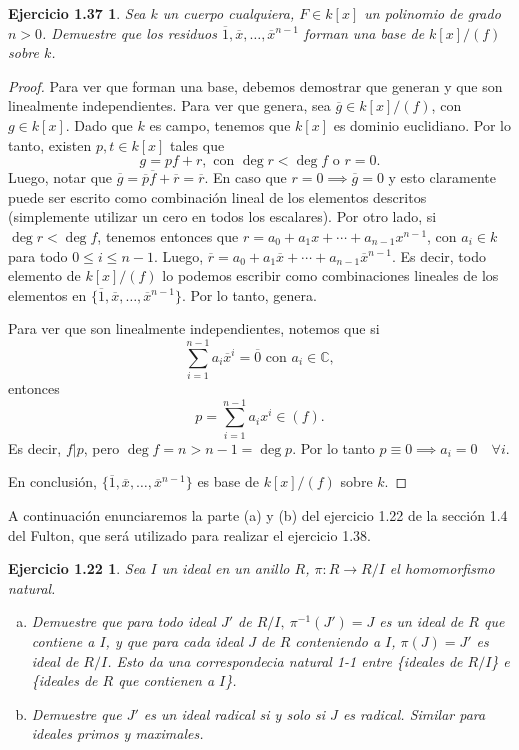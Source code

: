 \documentclass{amsart}
\theoremstyle{plain}
\newtheorem*{ejercicio4}{Ejercicio 1.37}
\newtheorem*{ejercicio22}{Ejercicio 1.22}
\newcommand{\C}{\mathbb{C}}
\begin{document}
	\begin{ejercicio4}
		Sea $k$ un cuerpo cualquiera, $F \in k[x]$ un polinomio de grado $n > 0$. Demuestre que los residuos $\overline{1},\overline{x},\dots,\overline{x}^{n - 1}$ forman una base de $k[x] \slash (f)$ sobre $k$.
	\end{ejercicio4}
	\begin{proof}
		Para ver que forman una base, debemos demostrar que generan y que son linealmente independientes. Para ver que genera, sea $\overline{g} \in k[x] \slash (f)$, con $g \in k[x]$. Dado que $k$ es campo, tenemos que $k[x]$ es dominio euclidiano. Por lo tanto, existen $p,t \in k[x]$ tales que
		\[ g = pf + r, \text{ con } \deg r < \deg f \text{ o } r = 0. \]
		Luego, notar que $\overline{g} = \overline{p} \overline{f} + \overline{r} = \overline{r}$. En caso que $r = 0 \implies \overline{g} = 0$ y esto claramente puede ser escrito como combinación lineal de los elementos descritos (simplemente utilizar un cero en todos los escalares). Por otro lado, si $\deg r < \deg f$, tenemos entonces que $r = a_{0} + a_{1} x + \cdots + a_{n-1} x^{n-1}$, con $a_{i} \in k$ para todo $0 \leq i \leq n-1$. Luego, $\overline{r} = a_{0} + a_{1} \overline{x} + \cdots + a_{n-1} \overline{x}^{n-1}$. Es decir, todo elemento de $k[x] \slash (f)$ lo podemos escribir como combinaciones lineales de los elementos en $\{\overline{1}, \overline{x}, \dots, \overline{x}^{n - 1}\}$. Por lo tanto, genera. \par
		Para ver que son linealmente independientes, notemos que si
		\[ \sum_{i=1}^{n-1} a_{i} \overline{x}^{i} = \overline{0} \text{ con } a_{i} \in \C, \]
		entonces
		\[ p = \sum_{i=1}^{n-1} a_{i} x^{i} \in (f). \]
		Es decir, $f | p$, pero $\deg f = n > n - 1 = \deg p$. Por lo tanto $p \equiv 0 \implies a_{i} = 0 \quad \forall i$. \par
		En conclusión, $\{\overline{1}, \overline{x},\dots, \overline{x}^{n-1}\}$ es base de $k[x] \slash (f)$ sobre $k$. 
	\end{proof}

	A continuación enunciaremos la parte (a) y (b) del ejercicio 1.22 de la sección 1.4 del Fulton, que será utilizado para realizar el ejercicio 1.38.

	\begin{ejercicio22}
		Sea $I$ un ideal en un anillo $R$, $\pi \colon R \to R \slash I$ el homomorfismo natural.
		\begin{enumerate}[(a)]
			\item Demuestre que para todo ideal $J'$ de $R \slash I,\ \pi^{-1}(J') = J$ es un ideal de $R$ que contiene a $I$, y que para cada ideal $J$ de $R$ conteniendo a $I$, $\pi(J) = J'$ es ideal de $R \slash I$. Esto da una correspondecia natural 1-1 entre \{ideales de $R \slash I$\} e \{ideales de $R$ que contienen a $I$\}.

			\item Demuestre que $J'$ es un ideal radical si y solo si $J$ es radical. Similar para ideales primos y maximales.
		\end{enumerate}
	\end{ejercicio22}
	
\end{document}
